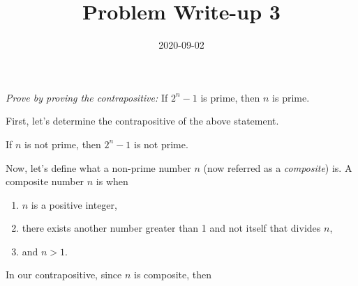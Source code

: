 \documentclass[12pt,a4paper]{article}
\title{Problem Write-up 3}
\date{2020-09-02}
\begin{document}
    \begin{problem}
        \emph{Prove by proving the contrapositive:} If \(2^n - 1\) is prime, then \(n\) is prime.
    \end{problem}
    
    \begin{answer}
        First, let's determine the contrapositive of the above statement.
        \begin{indcontrapositive}
        	If \(n\) is not prime, then \(2^n - 1\) is not prime.
        \end{indcontrapositive}
        Now, let's define what a non-prime number \(n\) (now referred as a \emph{composite}) is.
        A composite number \(n\) is when
        \begin{enumerate}
        	\item \(n\) is a positive integer,
        	\item there exists another number greater than 1 and not itself that divides \(n\),
        	\item and \(n > 1\).
    	\end{enumerate}
    	In our contrapositive, since \(n\) is composite, then 
    \end{answer}
\end{document}
